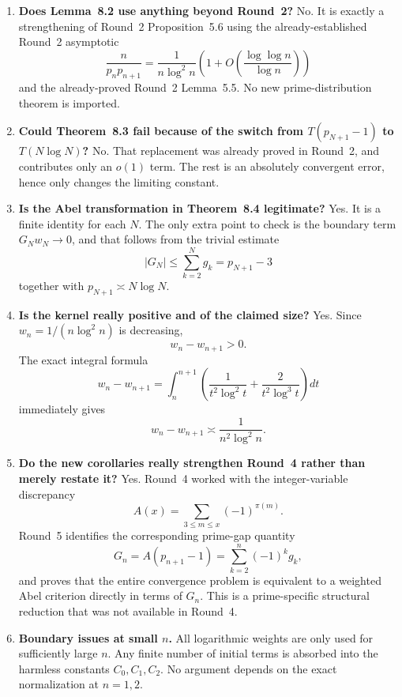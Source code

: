\begin{enumerate}
\item \textbf{Does Lemma~8.2 use anything beyond Round~2?}
No.
It is exactly a strengthening of Round~2 Proposition~5.6 using the already-established Round~2 asymptotic
\[
\frac{n}{p_n p_{n+1}} = \frac{1}{n\log^2 n}\left(1+O\!\left(\frac{\log\log n}{\log n}\right)\right)
\]
and the already-proved Round~2 Lemma~5.5.
No new prime-distribution theorem is imported.

\item \textbf{Could Theorem~8.3 fail because of the switch from $T(p_{N+1}-1)$ to $T(N\log N)$?}
No.
That replacement was already proved in Round~2, and contributes only an $o(1)$ term.
The rest is an absolutely convergent error, hence only changes the limiting constant.

\item \textbf{Is the Abel transformation in Theorem~8.4 legitimate?}
Yes.
It is a finite identity for each $N$.
The only extra point to check is the boundary term $G_Nw_N\to0$, and that follows from the trivial estimate
\[
|G_N|\le \sum_{k=2}^N g_k = p_{N+1}-3
\]
together with $p_{N+1}\asymp N\log N$.

\item \textbf{Is the kernel really positive and of the claimed size?}
Yes.
Since $w_n=1/(n\log^2 n)$ is decreasing,
\[
w_n-w_{n+1}>0.
\]
The exact integral formula
\[
w_n-w_{n+1}
=
\int_n^{n+1}\left(\frac{1}{t^2\log^2 t}+\frac{2}{t^2\log^3 t}\right)dt
\]
immediately gives
\[
w_n-w_{n+1}\asymp \frac{1}{n^2\log^2 n}.
\]

\item \textbf{Do the new corollaries really strengthen Round~4 rather than merely restate it?}
Yes.
Round~4 worked with the integer-variable discrepancy
\[
A(x)=\sum_{3\le m\le x}(-1)^{\pi(m)}.
\]
Round~5 identifies the corresponding prime-gap quantity
\[
G_n=A(p_{n+1}-1)=\sum_{k=2}^n (-1)^k g_k,
\]
and proves that the entire convergence problem is equivalent to a weighted Abel criterion directly in terms of $G_n$.
This is a prime-specific structural reduction that was not available in Round~4.

\item \textbf{Boundary issues at small $n$.}
All logarithmic weights are only used for sufficiently large $n$.
Any finite number of initial terms is absorbed into the harmless constants $C_0,C_1,C_2$.
No argument depends on the exact normalization at $n=1,2$.
\end{enumerate}

